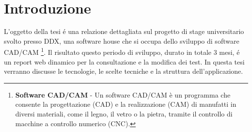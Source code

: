 \chapter{Introduzione}
    L'oggetto della tesi \'e una relazione dettagliata sul progetto di stage universitario svolto presso DDX,
    una software house che si occupa dello sviluppo di software CAD/CAM
    \footnote{\textbf{Software CAD/CAM} - Un software CAD/CAM è un programma che consente la progettazione (CAD)
    e la realizzazione (CAM) di manufatti in diversi materiali, come il legno, il vetro o la pietra, tramite 
    il controllo di macchine a controllo numerico (CNC).}.
    Il risultato questo periodo di sviluppo, durato in totale 3 mesi, \'e un report web dinamico per la consultazione e la modifica dei test. 
    In questa tesi verranno discusse le tecnologie, le scelte tecniche e la struttura dell'applicazione.
